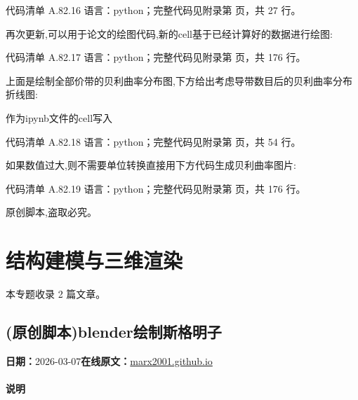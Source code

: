 \documentclass[lang=cn,scheme=chinese,color=blue,device=normal,toc=onecol,math=cm]{elegantbook}
\begin{document}
\begin{codeindexbox}{代码清单 A.82.16}
语言：python；完整代码见附录第 \pageref{code:82:16} 页，共 27 行。
\end{codeindexbox}


再次更新,可以用于论文的绘图代码,新的cell基于已经计算好的数据进行绘图:\par


\begin{codeindexbox}{代码清单 A.82.17}
语言：python；完整代码见附录第 \pageref{code:82:17} 页，共 176 行。
\end{codeindexbox}


上面是绘制全部价带的贝利曲率分布图,下方给出考虑导带数目后的贝利曲率分布折线图:\par


作为ipynb文件的cell写入\par


\begin{codeindexbox}{代码清单 A.82.18}
语言：python；完整代码见附录第 \pageref{code:82:18} 页，共 54 行。
\end{codeindexbox}


如果数值过大,则不需要单位转换直接用下方代码生成贝利曲率图片:\par


\begin{codeindexbox}{代码清单 A.82.19}
语言：python；完整代码见附录第 \pageref{code:82:19} 页，共 176 行。
\end{codeindexbox}


原创脚本,盗取必究。\par


\chapter{结构建模与三维渲染}
\begin{partbox}本专题收录 2 篇文章。\end{partbox}

\section{(原创脚本)blender绘制斯格明子}
\begin{articlemeta}
\textbf{日期：}2026-03-07\hfill\textbf{在线原文：}\href{https://marx2001.github.io/sci-note\_posts/20260307-blender}{marx2001.github.io}
\end{articlemeta}

\subsubsection{说明}
\end{document}

